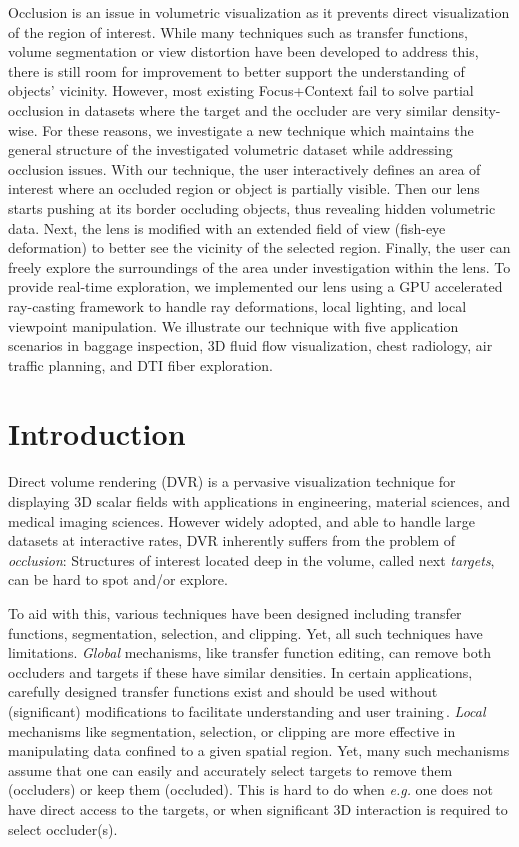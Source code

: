 \NewPage






Occlusion is an issue in volumetric visualization as it prevents direct visualization of the region of interest. While many techniques such as transfer functions, volume segmentation or view distortion have been developed to address this, there is still room for improvement to better support the understanding of objects' vicinity. However, most existing Focus+Context fail to solve partial occlusion in datasets where the target and the occluder are very similar density-wise. For these reasons, we investigate a new technique which maintains the general structure of the investigated volumetric dataset while addressing occlusion issues. With our technique, the user interactively defines an area of interest where an occluded region or object is partially visible. Then our lens starts pushing at its border occluding objects, thus revealing hidden volumetric data. Next, the lens is modified with an extended field of view (fish-eye deformation) to better see the vicinity of the selected region. Finally, the user can freely explore the surroundings of the area under investigation within the lens. To provide real-time exploration, we implemented our lens using a GPU accelerated ray-casting framework
to handle ray deformations, local lighting, and local viewpoint manipulation. We illustrate our technique with five application scenarios in baggage inspection, 3D fluid flow visualization, chest radiology, air traffic planning, and DTI fiber exploration.

\section{Introduction}
Direct volume rendering (DVR) is a pervasive visualization technique for displaying 3D scalar fields with applications in engineering, material sciences, and medical imaging sciences. However widely adopted, and able to handle large datasets at interactive rates, DVR inherently suffers from the problem of \emph{occlusion}: Structures of interest located deep in the volume, called next \emph{targets}, can be hard to spot and/or explore.

To aid with this, various techniques have been designed including transfer functions, segmentation, selection, and clipping. Yet, all such techniques have limitations.  \emph{Global} mechanisms, like transfer function editing, can remove both occluders and targets if these have similar densities. In certain applications, carefully designed transfer functions exist and should be used without (significant) modifications to facilitate understanding and user training\,\cite{4276082}. \emph{Local} mechanisms like segmentation, selection, or clipping are more effective in manipulating data confined to a given spatial region. Yet, many such mechanisms assume that one can easily and accurately select targets to remove them (occluders) or keep them (occluded). This is hard to do when \emph{e.g.} one does not have direct access to the targets, or when significant 3D interaction is required to select occluder(s).

